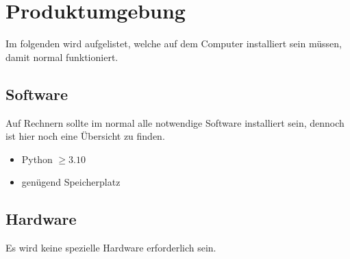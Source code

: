 \chapter{Produktumgebung}
Im folgenden wird aufgelistet, welche  auf dem Computer installiert sein müssen, damit \e normal funktioniert.\\

\section{Software}
Auf Rechnern sollte im normal alle notwendige Software installiert sein, dennoch ist hier noch eine Übersicht zu finden.

\begin{itemize}
	\item Python $ \geq 3.10$
	\item genügend Speicherplatz 
\end{itemize}

\section{Hardware}
Es wird keine spezielle Hardware erforderlich sein.